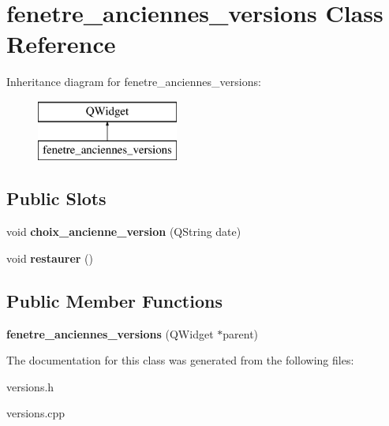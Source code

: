 \hypertarget{classfenetre__anciennes__versions}{}\section{fenetre\+\_\+anciennes\+\_\+versions Class Reference}
\label{classfenetre__anciennes__versions}
Inheritance diagram for fenetre\+\_\+anciennes\+\_\+versions\+:\begin{figure}[H]
\begin{center}
\leavevmode
\includegraphics[height=2.000000cm]{classfenetre__anciennes__versions}
\end{center}
\end{figure}
\subsection*{Public Slots}
\begin{DoxyCompactItemize}
\item 
\mbox{\label{classfenetre__anciennes__versions_aff29c8425f322a7e82c950bc77f5ce6d}} 
void {\bfseries choix\+\_\+ancienne\+\_\+version} (Q\+String date)
\item 
\mbox{\label{classfenetre__anciennes__versions_a6a4e824ee33424c6fb8f6fd7331ee900}} 
void {\bfseries restaurer} ()
\end{DoxyCompactItemize}
\subsection*{Public Member Functions}
\begin{DoxyCompactItemize}
\item 
\mbox{\label{classfenetre__anciennes__versions_a4e97516e26d1506c22fade6a4a641c45}} 
{\bfseries fenetre\+\_\+anciennes\+\_\+versions} (Q\+Widget $\ast$parent)
\end{DoxyCompactItemize}


The documentation for this class was generated from the following files\+:\begin{DoxyCompactItemize}
\item 
versions.\+h\item 
versions.\+cpp\end{DoxyCompactItemize}
